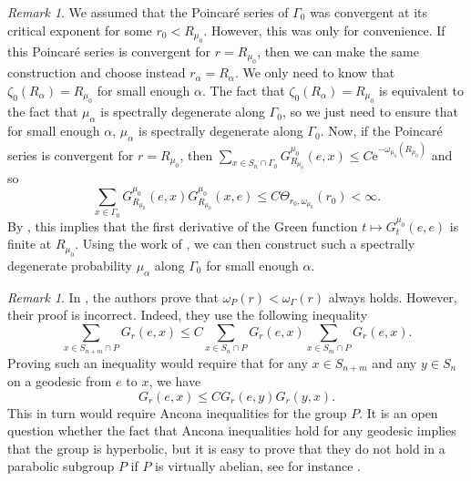 \documentclass{amsart}
\newcommand{\showcomments}{yes}
\newenvironment{comment}%
{\ifthenelse{\equal{\showcomments}{yes}}%
{\footnotemark
    \begin{lrbox}{\commentbox}
    \begin{minipage}[t]{1.25in}\raggedright\sffamily\upshape\tiny
    \footnotemark[\arabic{footnote}]}%
{\begin{lrbox}{\commentbox}}}%
{\ifthenelse{\equal{\showcomments}{yes}}%
{\end{minipage}\end{lrbox}\marginpar{\usebox{\commentbox}}}%
{\end{lrbox}}}
\newtheorem{conj}[thm]{Conjecture}
\theoremstyle{definition}
\theoremstyle{remark}
\newtheorem{rem}[thm]{Remark}
\begin{document}
\begin{rem}
We assumed that the Poincaré series of $\Gamma_0$ was convergent at its critical exponent for some $r_0<R_{\mu_0}$.
However, this was only for convenience.
If this Poincaré series is convergent for $r=R_{\mu_0}$, then we can make the same construction and choose instead $r_\alpha=R_\alpha$.
We only need to know that $\zeta_0(R_\alpha)=R_{\mu_0}$ for small enough $\alpha$.
The fact that $\zeta_0(R_\alpha)=R_{\mu_0}$ is equivalent to the fact that $\mu_\alpha$ is spectrally degenerate along $\Gamma_0$, so we just need to ensure that for small enough $\alpha$, $\mu_\alpha$ is spectrally degenerate along $\Gamma_0$.
Now, if the Poincaré series is convergent for $r=R_{\mu_0}$, then $\sum_{x\in S_n\cap \Gamma_0}G^{\mu_0}_{R_{\mu_0}}(e,x)\leq C\mathrm{e}^{-\omega_{\mu_0}(R_{\mu_0})}$ and so
$$\sum_{x\in \Gamma_0}G^{\mu_0}_{R_{\mu_0}}(e,x)G^{\mu_0}_{R_{\mu_0}}(x,e)\leq C\Theta_{r_0,\omega_{\mu_0}}(r_0)<\infty.$$
By \cite[Proposition~1.9]{GouezelLalley}, this implies that the first derivative of the Green function $t\mapsto G^{\mu_0}_t(e,e)$ is finite at $R_{\mu_0}$.
Using the work of \cite[Section~7]{CandelleroGilch}, we can then construct such a spectrally degenerate probability $\mu_\alpha$ along $\Gamma_0$ for small enough $\alpha$.
\end{rem}

\begin{rem}\label{CGMGap}
In \cite[Lemma~4.7]{CandelleroGilchMuller}, the authors prove that $\omega_P(r)<\omega_\Gamma(r)$ always holds.
However, their proof is incorrect.
Indeed, they use the following inequality
$$\sum_{x\in S_{n+m}\cap P}G_r(e,x)\leq C\sum_{x\in S_n\cap P}G_r(e,x)\sum_{x\in S_m\cap P}G_r(e,x).$$
Proving such an inequality would require that for any $x\in S_{n+m}$ and any $y\in S_n$ on a geodesic from $e$ to $x$, we have
$$G_r(e,x)\leq C G_r(e,y)G_r(y,x).$$
This in turn would require Ancona inequalities for the group $P$.
It is an open question whether the fact that Ancona inequalities hold for any geodesic implies that the group is hyperbolic, but it is easy to prove that they do not hold in a parabolic subgroup $P$ if $P$ is virtually abelian, see for instance \cite[Section~5.2]{DG20}.
\end{rem}

\end{document}
